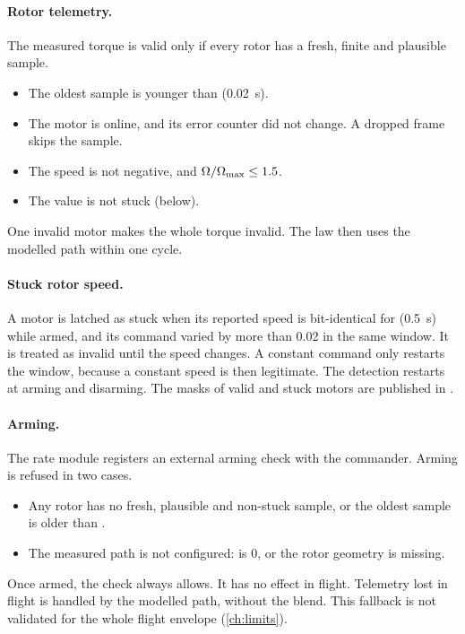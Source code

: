 \paragraph{Rotor telemetry.}
The measured torque is valid only if every rotor has a fresh, finite and plausible sample.
\begin{itemize}
  \item The oldest sample is younger than  (0.02~s).
  \item The motor is online, and its error counter did not change.
    A dropped frame skips the sample.
  \item The speed is not negative, and $\Omega/\Omega_{\max}\le 1.5$.
  \item The value is not stuck (below).
\end{itemize}
One invalid motor makes the whole torque invalid.
The law then uses the modelled path within one cycle.

\paragraph{Stuck rotor speed.}
A motor is latched as stuck when its reported speed is bit-identical for  (0.5~s) while armed, and its command varied by more than 0.02 in the same window.
It is treated as invalid until the speed changes.
A constant command only restarts the window, because a constant speed is then legitimate.
The detection restarts at arming and disarming.
The masks of valid and stuck motors are published in .

\paragraph{Arming.}
The rate module registers an external arming check with the commander.
Arming is refused in two cases.
\begin{itemize}
  \item Any rotor has no fresh, plausible and non-stuck sample, or the oldest sample is older than .
  \item The measured path is not configured:  is 0, or the  rotor geometry is missing.
\end{itemize}
Once armed, the check always allows.
It has no effect in flight.
Telemetry lost in flight is handled by the modelled path, without the blend.
This fallback is not validated for the whole flight envelope (\cref{ch:limits}).

